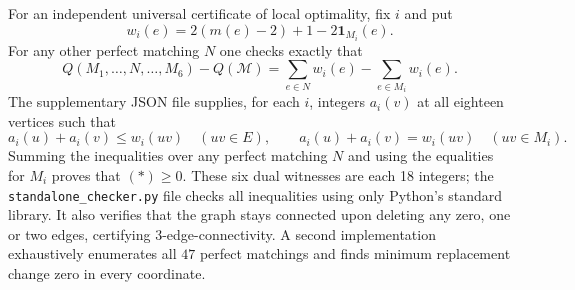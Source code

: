 \documentclass[11pt]{article}
\begin{document}
For an independent universal certificate of local optimality,
fix $i$ and put
\[
 w_i(e)=2(m(e)-2)+1-2\mathbf1_{M_i}(e).
\]
For any other perfect matching $N$ one checks exactly that
\[
 Q(M_1,\ldots,N,\ldots,M_6)-Q(\mathcal M)
 = \sum_{e\in N}w_i(e)-\sum_{e\in M_i}w_i(e).\tag{$\ast$}
\]
The supplementary JSON file supplies, for each $i$, integers
$a_i(v)$ at all eighteen vertices such that
\[
 a_i(u)+a_i(v)\le w_i(uv)\quad (uv\in E),\qquad
 a_i(u)+a_i(v)=w_i(uv)\quad(uv\in M_i).
\]
Summing the inequalities over any perfect matching $N$ and
using the equalities for $M_i$ proves that $(\ast)\ge0$.
These six dual witnesses are each 18 integers; the
\texttt{standalone\_checker.py} file checks all inequalities using
only Python's standard library. It also verifies that the graph
stays connected upon deleting any zero, one or two edges,
certifying 3-edge-connectivity. A second implementation
exhaustively enumerates all $47$ perfect matchings and finds
minimum replacement change zero in every coordinate.
\end{document}
